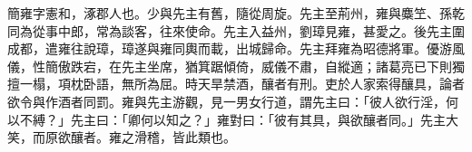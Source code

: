 \begin{pinyinscope}
 
 
 簡雍字憲和，涿郡人也。少與先主有舊，隨從周旋。先主至荊州，雍與麋笁、孫乾同為從事中郎，常為談客，往來使命。先主入益州，劉璋見雍，甚愛之。後先主圍成都，遣雍往說璋，璋遂與雍同輿而載，出城歸命。先主拜雍為昭德將軍。優游風儀，性簡傲跌宕，在先主坐席，猶箕踞傾倚，威儀不肅，自縱適；諸葛亮已下則獨擅一榻，項枕卧語，無所為屈。時天旱禁酒，釀者有刑。吏於人家索得釀具，論者欲令與作酒者同罰。雍與先主游觀，見一男女行道，謂先主曰：「彼人欲行淫，何以不縛？」先主曰：「卿何以知之？」雍對曰：「彼有其具，與欲釀者同。」先主大笑，而原欲釀者。雍之滑稽，皆此類也。
 
 
 
 
\end{pinyinscope}